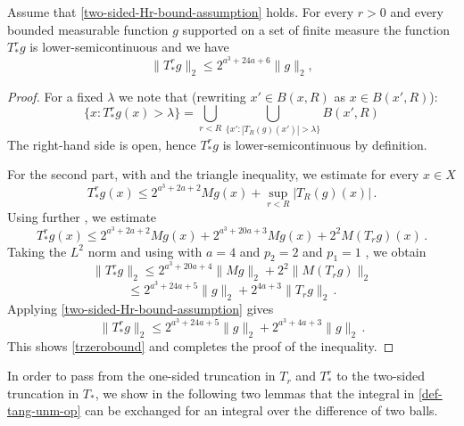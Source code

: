 \begin{lemma}\label{simple-nontangential-operator}
\leanok
{}
Assume that \eqref{two-sided-Hr-bound-assumption} holds.
For every $r>0$ and every bounded measurable function $g$ supported on a set of finite measure
the function $T_{*}^r g$ is lower-semicontinuous and we have
\begin{equation}\label{trzerobound}
    \|T_{*}^rg\|_2\le 2^{a^3+24a+6}\|g\|_2,
\end{equation}
\end{lemma}
\begin{proof}
\leanok
For a fixed $\lambda$ we note that (rewriting $x'\in B(x,R)$ as $x\in B(x',R)$):
\begin{equation}
    \{x : T_{*}^r g(x) > \lambda\} = \bigcup_{r<R}\bigcup_{\{x':|T_R(g)(x')|>\lambda\}} B(x',R)
\end{equation}
The right-hand side is open, hence $T_{*}^r g$ is lower-semicontinuous by definition.

For the second part, with  and the triangle inequality, we estimate for every $x\in X$
\begin{equation}
     T_{*}^r g(x)
     \le 2^{a^3 + 2a + 2} Mg(x)+\sup_{r<R} |T_R(g)(x)|\, .
\end{equation}
Using further , we estimate
\begin{equation}
      T_{*}^r g(x)
     \le 2^{a^3+2a+2}Mg(x) + 2^{a^3+20a+3}Mg(x) + 2^{2}M(T_rg)(x)\, .
\end{equation}
Taking the $L^2$ norm and using  with $a=4$  and $p_2=2$ and $p_1=1$ , we obtain
\begin{equation}
      \|T_{*}^r g\|_2
     \le 2^{a^3+20a+4} \|Mg\|_2 + 2^{2}\|M(T_rg)\|_2
\end{equation}
\begin{equation}
     \le 2^{a^3+24a+5} \|g\|_2 + 2^{4a+3}\|T_r g\|_2\, .
\end{equation}
Applying \eqref{two-sided-Hr-bound-assumption} gives
\begin{equation}
      \|T_{*}^r g\|_2\le 2^{a^3+24a+5}\|g\|_2 + 2^{a^3+4a+3}\|g\|_2\, .
\end{equation}
This shows \eqref{trzerobound} and completes the proof of the inequality.
\end{proof}
In order to pass from the one-sided truncation in $T_r$ and $T_{*}^r$ to the two-sided truncation in $T_*$, we show in the following two lemmas that the integral in \eqref{def-tang-unm-op} can be exchanged for an integral over the difference of two balls.
